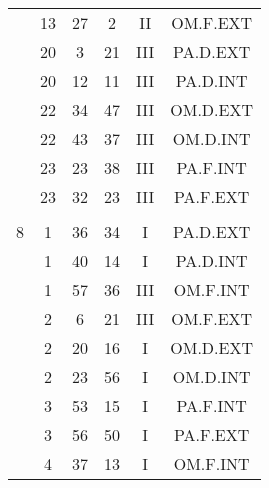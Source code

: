 \documentclass[12pt, a4paper]{article}
\begin{document}
\begin{multicols}{3}
{\begin{tabular}{c c c c c c}
	 	 	 	 & 13 & 27 & 2 & II & OM.F.EXT\\%
	 	 	 	 & 20 & 3 & 21 & III & PA.D.EXT\\%
	 	 	 	 & 20 & 12 & 11 & III & PA.D.INT\\%
	 	 	 	 & 22 & 34 & 47 & III & OM.D.EXT\\%
	 	 	 	 & 22 & 43 & 37 & III & OM.D.INT\\%
	 	 	 	 & 23 & 23 & 38 & III & PA.F.INT\\%
	 	 	 	 & 23 & 32 & 23 & III & PA.F.EXT\\%
	 	 	 	 & & & & & \\%
	 	 	 	8 & 1 & 36 & 34 & I & PA.D.EXT\\%
	 	 	 	 & 1 & 40 & 14 & I & PA.D.INT\\%
	 	 	 	 & 1 & 57 & 36 & III & OM.F.INT\\%
	 	 	 	 & 2 & 6 & 21 & III & OM.F.EXT\\%
	 	 	 	 & 2 & 20 & 16 & I & OM.D.EXT\\%
	 	 	 	 & 2 & 23 & 56 & I & OM.D.INT\\%
	 	 	 	 & 3 & 53 & 15 & I & PA.F.INT\\%
	 	 	 	 & 3 & 56 & 50 & I & PA.F.EXT\\%
	 	 	 	 & 4 & 37 & 13 & I & OM.F.INT\\%
	 	 \end{tabular}
 	}
\end{multicols}
\end{document}

